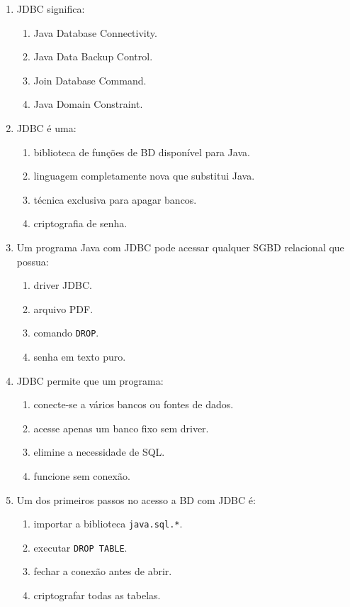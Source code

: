 \documentclass[12pt,a4paper]{article}
\begin{document}
\begin{enumerate}[label=\textbf{Q\arabic*.}]
\item JDBC significa:

\begin{enumerate}[label=\alph*)]
    \item Java Database Connectivity.
    \item Java Data Backup Control.
    \item Join Database Command.
    \item Java Domain Constraint.
\end{enumerate}

\item JDBC é uma:

\begin{enumerate}[label=\alph*)]
    \item biblioteca de funções de BD disponível para Java.
    \item linguagem completamente nova que substitui Java.
    \item técnica exclusiva para apagar bancos.
    \item criptografia de senha.
\end{enumerate}

\item Um programa Java com JDBC pode acessar qualquer SGBD relacional que possua:

\begin{enumerate}[label=\alph*)]
    \item driver JDBC.
    \item arquivo PDF.
    \item comando \texttt{DROP}.
    \item senha em texto puro.
\end{enumerate}

\item JDBC permite que um programa:

\begin{enumerate}[label=\alph*)]
    \item conecte-se a vários bancos ou fontes de dados.
    \item acesse apenas um banco fixo sem driver.
    \item elimine a necessidade de SQL.
    \item funcione sem conexão.
\end{enumerate}

\item Um dos primeiros passos no acesso a BD com JDBC é:

\begin{enumerate}[label=\alph*)]
    \item importar a biblioteca \texttt{java.sql.*}.
    \item executar \texttt{DROP TABLE}.
    \item fechar a conexão antes de abrir.
    \item criptografar todas as tabelas.
\end{enumerate}


\end{enumerate}
\end{document}

